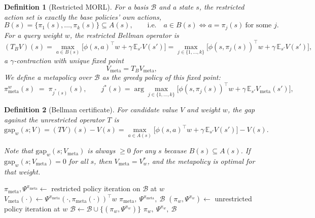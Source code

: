 \documentclass[11pt]{article}
\newtheorem{definition}{Definition}
\begin{document}
\begin{definition}[Restricted MORL]\label{def:meta}
For a basis $\mathcal B$ and a state $s$, the restricted action set is exactly the base policies'
own actions,
\[
B(s) = \{\pi_1(s),\dots,\pi_k(s)\} \subseteq A(s), \qquad\text{i.e.}\quad a\in B(s) \iff a=\pi_j(s)\ \text{for some } j.
\]
For a query weight $w$, the restricted Bellman operator is
\[
(T_BV)(s)=\max_{a\in B(s)}\big[\phi(s,a)^\top w+\gamma\,\mathbb{E}_{s'}V(s')\big]
         =\max_{j\in\{1,\dots,k\}}\big[\phi(s,\pi_j(s))^\top w+\gamma\,\mathbb{E}_{s'}V(s')\big],
\]
a $\gamma$-contraction with unique fixed point
\[
V_{\mathrm{meta}}=T_BV_{\mathrm{meta}},
\]
We define a metapolicy over $\mathcal{B}$ as the greedy policy of this fixed point:
\[
\pi^w_{\mathrm{meta}}(s) \;=\; \pi_{j^*(s)}(s), \qquad
j^*(s) = \arg\max_{j\in\{1,\dots,k\}}\big[\phi(s,\pi_j(s))^\top w+\gamma\,\mathbb{E}_{s'}V_{\mathrm{meta}}(s')\big],
\]
\end{definition}

\begin{definition}[Bellman certificate]
For candidate value $V$ and weight $w$, the gap against the unrestricted operator $T$ is
\[
\mathrm{gap}_w(s;V) = (TV)(s)-V(s) = \max_{a\in A(s)}\big[\phi(s,a)^\top w+\gamma\,\mathbb{E}_{s'}V(s')\big]-V(s).
\]

Note that $\mathrm{gap}_w(s;V_{\mathrm{meta}})$ is always $\ge 0$ for any $s$ because $B(s) \subseteq A(s)$. If $\mathrm{gap}_w(s;V_{\mathrm{meta}})=0$ for all $s$, then $V_{\mathrm{meta}}=V^*_w$, and the metapolicy is optimal for that weight. 
\end{definition}


\begin{algorithm}[H]
\caption{\textsc{Certify-or-Grow}$(w,\mathcal{B})$}
\begin{algorithmic}[1]
\State $\pi_{\mathrm{meta}},\Psi^{\pi_{\mathrm{meta}}} \gets$ restricted policy iteration on $\mathcal B$ at $w$ 
\State $V_{\mathrm{meta}}(\cdot)\gets\Psi^{\pi_{\mathrm{meta}}}(\cdot,\pi_{\mathrm{meta}}(\cdot))^\top w$
    \State \Return $\pi_{\mathrm{meta}},\ \Psi^{\pi_{\mathrm{meta}}},\ \mathcal{B}$
\Else
    \State $(\pi_w,\Psi^{\pi_w}) \gets$ unrestricted policy iteration at $w$ \label{alg:cog-fallback}
    \State $\mathcal{B}\gets\mathcal{B}\cup\{(\pi_w,\Psi^{\pi_w})\}$ 
    \State \Return $\pi_w,\ \Psi^{\pi_w},\ \mathcal{B}$
\EndIf
\end{algorithmic}
\end{algorithm}
\end{document}
